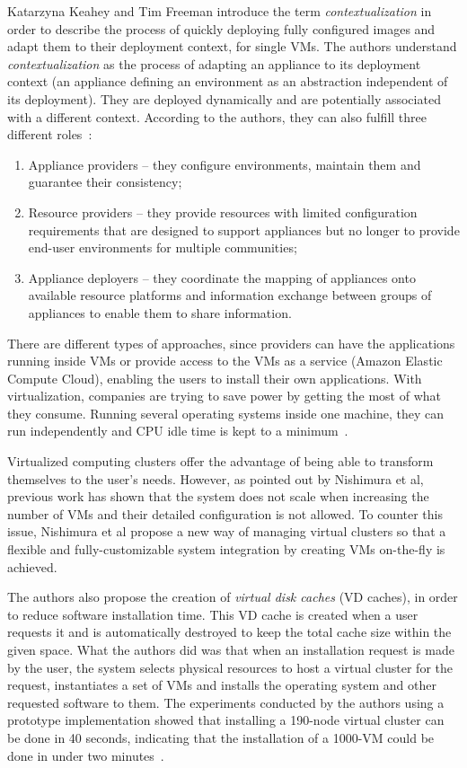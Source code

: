 Katarzyna Keahey and Tim Freeman introduce the term \textit{contextualization} in order to describe the process of quickly deploying fully configured images and adapt them to their deployment context, for single VMs. The authors understand \textit{contextualization} as the process of adapting an appliance to its deployment context (an appliance defining an environment as an abstraction independent of its deployment). They are deployed dynamically and are potentially associated with a different context. According to the authors, they can also fulfill three different roles~\cite{contextualization}:
\begin{enumerate}
\item Appliance providers -- they configure environments, maintain them and guarantee their consistency;
\item Resource providers -- they provide resources with limited configuration requirements that are designed to support appliances but no longer to provide end-user environments for multiple communities;
\item Appliance deployers -- they coordinate the mapping of appliances  onto available resource platforms and information exchange between groups of appliances to enable them to share information.
\end{enumerate}

There are different types of approaches, since providers can have the applications running inside VMs or provide access to the VMs as a service (Amazon Elastic Compute Cloud), enabling the users to install their own applications. With virtualization, companies are trying to save power by getting the most of what they consume. Running several operating systems inside one machine, they can run independently and CPU idle time is kept to a minimum~\cite{aaron-clouds}.

Virtualized computing clusters offer the advantage of being able to transform themselves to the user's needs. However, as pointed out by Nishimura et al, previous work has shown that the system does not scale when increasing the number of VMs and their detailed configuration is not allowed. To counter this issue, Nishimura et al propose a new way of managing virtual clusters so that a flexible and fully-customizable system integration by creating VMs on-the-fly is achieved. 

The authors also propose the creation of \textit{virtual disk caches} (VD caches), in order to reduce software installation time. This VD cache is created when a user requests it and is automatically destroyed to keep the total cache size within the given space. What the authors did was that when an installation request is made by the user, the system selects physical resources to host a virtual cluster for the request, instantiates a set of VMs and installs the operating system and other requested software to them. The experiments conducted by the authors using a prototype implementation showed that installing a 190-node virtual cluster can be done in 40 seconds, indicating that the installation of a 1000-VM could be done in under two minutes~\cite{nishimura}.

